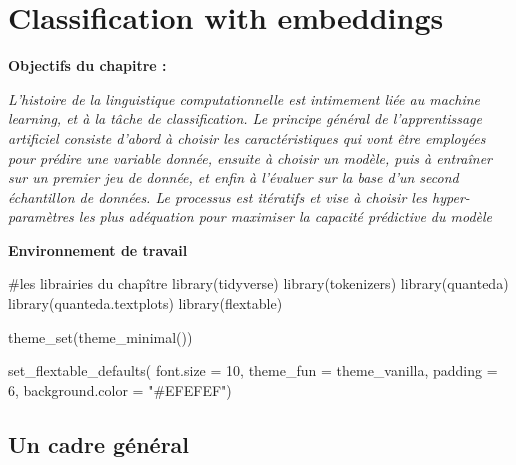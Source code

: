 \documentclass[
  letterpaper,
  DIV=11,
  numbers=noendperiod]{scrreprt}
\newenvironment{Shaded}{\begin{snugshade}}{\end{snugshade}}
\newcommand{\AttributeTok}[1]{\textcolor[rgb]{0.40,0.45,0.13}{#1}}
\newcommand{\CommentTok}[1]{\textcolor[rgb]{0.37,0.37,0.37}{#1}}
\newcommand{\DecValTok}[1]{\textcolor[rgb]{0.68,0.00,0.00}{#1}}
\newcommand{\FunctionTok}[1]{\textcolor[rgb]{0.28,0.35,0.67}{#1}}
\newcommand{\NormalTok}[1]{\textcolor[rgb]{0.00,0.23,0.31}{#1}}
\newcommand{\StringTok}[1]{\textcolor[rgb]{0.13,0.47,0.30}{#1}}
\begin{document}

\chapter{Classification with
embeddings}\label{classification-with-embeddings}

\textbf{Objectifs du chapitre :}

\emph{L'histoire de la linguistique computationnelle est intimement liée
au machine learning, et à la tâche de classification. Le principe
général de l'apprentissage artificiel consiste d'abord à choisir les
caractéristiques qui vont être employées pour prédire une variable
donnée, ensuite à choisir un modèle, puis à entraîner sur un premier jeu
de donnée, et enfin à l'évaluer sur la base d'un second échantillon de
données. Le processus est itératifs et vise à choisir les
hyper-paramètres les plus adéquation pour maximiser la capacité
prédictive du modèle}

\textbf{Environnement de travail}

\begin{Shaded}
\begin{Highlighting}[]
\CommentTok{\#les librairies du chapître}
\FunctionTok{library}\NormalTok{(tidyverse)}
\FunctionTok{library}\NormalTok{(tokenizers)}
\FunctionTok{library}\NormalTok{(quanteda)}
\FunctionTok{library}\NormalTok{(quanteda.textplots)}
\FunctionTok{library}\NormalTok{(flextable)}

\FunctionTok{theme\_set}\NormalTok{(}\FunctionTok{theme\_minimal}\NormalTok{()) }

\FunctionTok{set\_flextable\_defaults}\NormalTok{(}
  \AttributeTok{font.size =} \DecValTok{10}\NormalTok{, }\AttributeTok{theme\_fun =}\NormalTok{ theme\_vanilla,}
  \AttributeTok{padding =} \DecValTok{6}\NormalTok{,}
  \AttributeTok{background.color =} \StringTok{"\#EFEFEF"}\NormalTok{)}
\end{Highlighting}
\end{Shaded}

\section{Un cadre général}\label{un-cadre-guxe9nuxe9ral}
\end{document}
